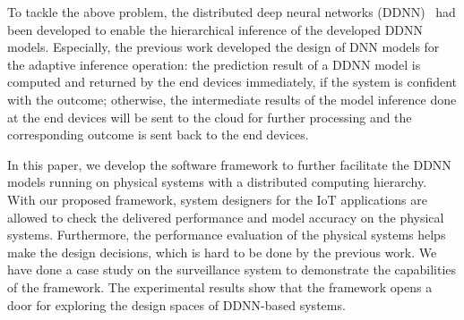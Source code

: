 \documentclass[conference]{IEEEtran}
\begin{document}
To tackle the above problem, the distributed deep neural networks (DDNN)~\cite{Teerapittayanon17} had been developed to enable the hierarchical inference of the developed DDNN models. Especially, the previous work developed the design of DNN models for the adaptive inference operation: the prediction result of a DDNN model is computed and returned by the end devices immediately, if the system is confident with the outcome; otherwise, the intermediate results of the model inference done at the end devices will be sent to the cloud for further processing and the corresponding outcome is sent back to the end devices.

In this paper, we develop the software framework to further facilitate the DDNN models running on physical systems with a distributed computing hierarchy. With our proposed framework, system designers for the IoT applications are allowed to check the delivered performance and model accuracy on the physical systems. Furthermore, the performance evaluation of the physical systems helps make the design decisions, which is hard to be done by the previous work. We have done a case study on the surveillance system to demonstrate the capabilities of the framework.%
The experimental results show that the framework opens a door for exploring the design spaces of DDNN-based systems.


%
%
\end{document}
